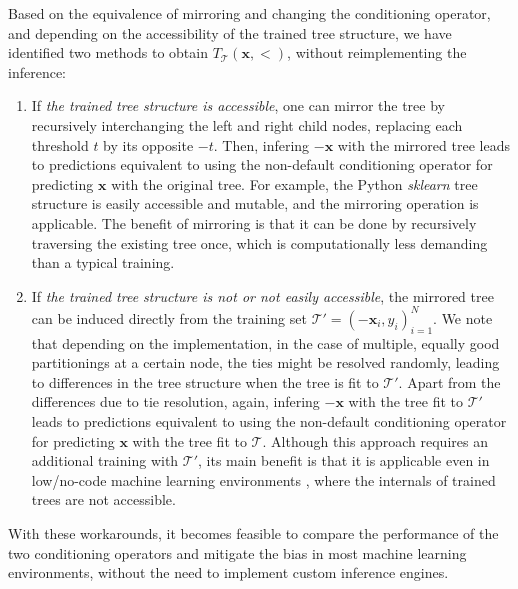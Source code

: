 \documentclass[sn-mathphys]{sn-jnl}%
\theoremstyle{thmstyleone}%
\theoremstyle{thmstyletwo}%
\theoremstyle{thmstylethree}%
\begin{document}
Based on the equivalence of mirroring and changing the conditioning operator, and depending on the accessibility of the trained tree structure, we have identified two methods to obtain $T_{\mathcal{T}}(\mathbf{x}, <)$, without reimplementing the inference:
\begin{enumerate}
\item If \emph{the trained tree structure is accessible}, one can mirror the tree by recursively interchanging the left and right child nodes, replacing each threshold $t$ by its opposite $-t$. Then, infering $-\mathbf{x}$ with the mirrored tree leads to predictions equivalent to using the non-default conditioning operator for predicting $\mathbf{x}$ with the original tree. For example, the Python \emph{sklearn} \citep{sklearn} tree structure is easily accessible and mutable, and the mirroring operation is applicable. The benefit of mirroring is that it can be done by recursively traversing the existing tree once, which is computationally less demanding than a typical training.
\item If \emph{the trained tree structure is not or not easily accessible}, the mirrored tree can be induced directly from the training set $\mathcal{T}' = (-\mathbf{x}_i, y_i)_{i=1}^N$. We note that depending on the implementation, in the case of multiple, equally good partitionings at a certain node, the ties might be resolved randomly, leading to differences in the tree structure when the tree is fit to $\mathcal{T}'$. Apart from the differences due to tie resolution, again, infering $-\mathbf{x}$ with the tree fit to $\mathcal{T}'$ leads to predictions equivalent to using the non-default conditioning operator for predicting $\mathbf{x}$ with the tree fit to $\mathcal{T}$.
Although this approach requires an additional training with $\mathcal{T}'$, its main benefit is that it is applicable even in low/no-code machine learning environments \citep{nocode}, where the internals of trained trees are not accessible.
\end{enumerate}
With these workarounds, it becomes feasible to compare the performance of the two conditioning operators and mitigate the bias in most machine learning environments, without the need to implement custom inference engines.

\end{document}
